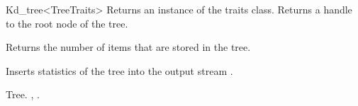 \begin{ccRefClass}{Kd_tree<TreeTraits>}
{
Returns an instance of the traits class.
}
{
Returns a handle to the root node of the tree.
}



{
Returns the number of items that are stored in the tree.
}

\begin{ccAdvanced}

{
Inserts statistics of the tree into the output stream .
}

\end{ccAdvanced}


\ccSeeAlso
Tree.
,
.

\end{ccRefClass}


